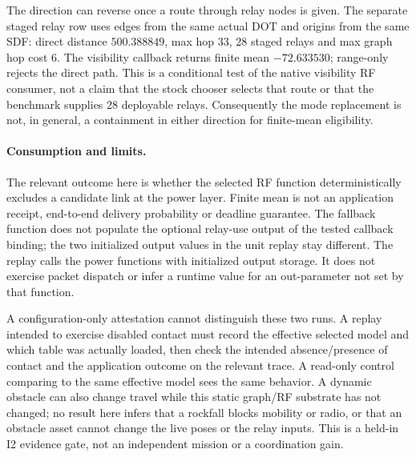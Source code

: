 \documentclass[11pt]{article}
\begin{document}
The direction can reverse once a route through relay nodes is given.
The separate staged relay row uses edges from the same actual DOT and
origins from the same SDF: direct distance \(500.388849\), max hop
\(33\), 28 staged relays and max graph hop cost \(6\). The visibility
callback returns finite mean \(-72.633530\); range-only rejects the direct
path. This is a conditional test of the native visibility RF consumer,
not a claim that the stock chooser selects that route or that the
benchmark supplies 28 deployable relays. Consequently the mode replacement
is not, in general, a containment in either direction for finite-mean
eligibility.

\paragraph{Consumption and limits.} The relevant outcome here is whether
the selected RF function deterministically excludes a candidate link at
the power layer. Finite mean is not an application receipt, end-to-end
delivery probability or deadline guarantee. The fallback function does
not populate the optional relay-use output of the tested callback binding;
the two initialized output values in the unit replay stay different.
The replay calls the power functions with initialized output storage.
It does not exercise packet dispatch or infer a runtime value for an
out-parameter not set by that function.

A configuration-only attestation cannot distinguish these two runs.
A replay intended to exercise disabled contact must record the effective
selected model and which table was actually loaded, then check the
intended absence/presence of contact and the application outcome on the
relevant trace. A read-only control comparing to the same effective
model sees the same behavior. A dynamic obstacle can also change
travel while this static graph/RF substrate has not changed; no result
here infers that a rockfall blocks mobility or radio, or that an obstacle
asset cannot change the live poses or the relay inputs. This is a held-in
I2 evidence gate, not an independent mission or a coordination gain.
\end{document}
